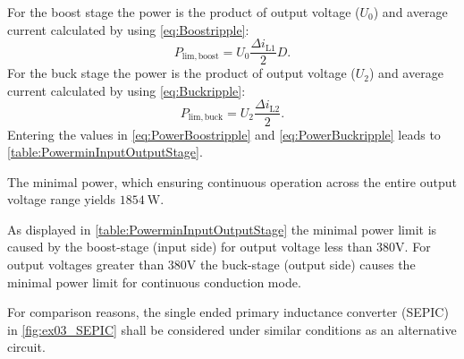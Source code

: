 
\begin{solutionblock}
    For the boost stage the power is the product of output voltage
     ($U_\mathrm{0}$) and average current calculated by using \eqref{eq:Boostripple}:
    \begin{equation}
        P_\mathrm{lim,boost}=U_\mathrm{0}\frac{\Delta i_\mathrm{L1}}{2}D.
        \label{eq:PowerBoostripple}
    \end{equation}
    For the buck stage the power is the product of output voltage
    ($U_\mathrm{2}$) and average current calculated by using \eqref{eq:Buckripple}:
    \begin{equation}
        P_\mathrm{lim,buck}=U_\mathrm{2}\frac{\Delta i_\mathrm{L2}}{2}.
        \label{eq:PowerBuckripple}
    \end{equation}
    Entering the values in \eqref{eq:PowerBoostripple} and \eqref{eq:PowerBuckripple} leads to \autoref{table:PowerminInputOutputStage}.
    
    The minimal power, which ensuring continuous operation across the entire output voltage range
    yields  $\SI{1854}{\watt}$.
\end{solutionblock}

\begin{solutionblock}
    As displayed in \autoref{table:PowerminInputOutputStage} the minimal power limit is caused by the 
    boost-stage (input side) for output voltage less than 380V. For output voltages greater than 380V 
    the buck-stage (output side) causes the minimal power limit for continuous conduction mode.
\end{solutionblock}

\vspace{2em}\par
For comparison reasons, the single ended primary inductance converter (SEPIC) in \autoref{fig:ex03_SEPIC} shall be considered under similar conditions as an alternative circuit.



